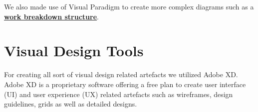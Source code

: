We also made use of Visual Paradigm to create more complex diagrams such as a 
\textbf{\hyperref[sec:work-breakdown-structure-(wbs)]{work breakdown structure}}.

\section{Visual Design Tools}\label{sec:visual-design-tools}

For creating all sort of visual design related artefacts we utilized Adobe XD\@.
Adobe XD is a proprietary software offering a free plan to create user interface (UI) and user experience (UX)
related artefacts such as wireframes, design guidelines, grids as well as detailed designs.
